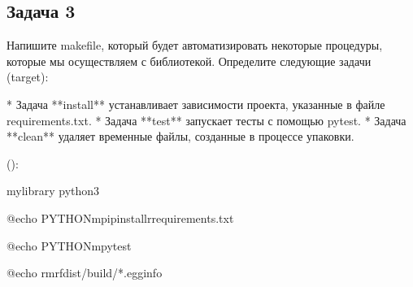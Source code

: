 \documentclass[letterpaper,10pt,russian]{sphinxmanual}
\begin{document}
\begin{sphinxVerbatim}[commandchars=\\\{\}]
    \PYG{p}{]}
      
\end{sphinxVerbatim}


\subsection{Задача 3}
\label{\detokenize{educational_materials/code_to_lib/exercises:id4}}
\sphinxAtStartPar
Напишите makefile, который будет автоматизировать некоторые процедуры, которые мы осуществляем с библиотекой. Определите следующие задачи (target):

\begin{sphinxVerbatim}[commandchars=\\\{\}]
* Задача **install** устанавливает зависимости проекта, указанные в файле requirements.txt.
* Задача **test** запускает тесты с помощью pytest.
* Задача **clean** удаляет временные файлы, созданные в процессе упаковки.
\end{sphinxVerbatim}

\sphinxAtStartPar
{}

\sphinxAtStartPar
():

\begin{sphinxVerbatim}[commandchars=\\\{\}]
my\PYGZhy{}library
python3

  

@echo
PYTHON\PYGZhy{}mpipinstall\PYGZhy{}rrequirements.txt

@echo
PYTHON\PYGZhy{}mpytest

@echo
rm\PYGZhy{}rfdist/build/*.egg\PYGZhy{}info
\end{sphinxVerbatim}
\end{document}
